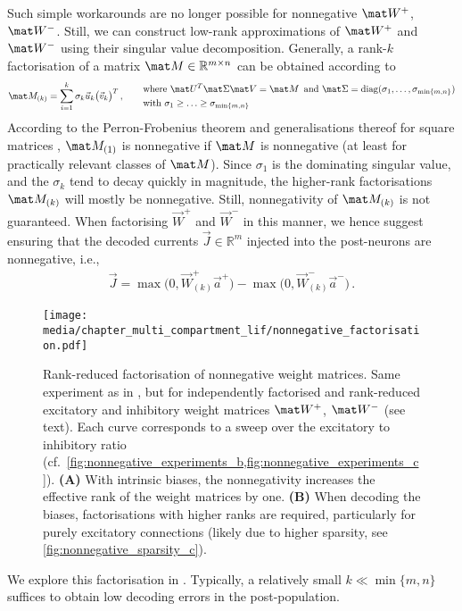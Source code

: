 Such simple workarounds are no longer possible for nonnegative $\mat W^+$, $\mat W^-$.
Still, we can construct low-rank approximations of $\mat W^+$ and $\mat W^-$ using their singular value decomposition.
Generally, a rank-$k$ factorisation of a matrix $\mat M \in \mathbb{R}^{m \times n}$ can be obtained according to
\begin{align}
	\mat M_{(k)} = \sum_{i = 1}^k \sigma_k \vec u_k \bigl(\vec v_k \bigr)^T \,, \quad\quad
	\begin{aligned}	
		&\text{where } \mat U^T \mat \Sigma \mat V = \mat M \,
		\text{ and } \mat \Sigma = \mathrm{diag}(\sigma_1, \ldots, \sigma_{\min\{m, n\}}) \\
		&\text{with }
	\sigma_1 \geq \ldots \geq \sigma_{\min\{m, n\}}
	\end{aligned}
	\label{eqn:svd_factorisation}
\end{align}
According to the Perron-Frobenius theorem and generalisations thereof for square matrices \citep{avin2013generalized}, $\mat M_{(1)}$ is nonnegative if $\mat M$ is nonnegative (at least for practically relevant classes of $\mat M$).
Since $\sigma_1$ is the dominating singular value, and the $\sigma_k$ tend to decay quickly in magnitude, the higher-rank factorisations $\mat M_{(k)}$ will mostly be nonnegative. Still, nonnegativity of $\mat M_{(k)}$ is not guaranteed.
When factorising $\vec W^+$ and $\vec W^-$ in this manner, we hence suggest ensuring that the decoded currents $\vec J \in \mathbb{R}^{m}$ injected into the post-neurons are nonnegative, i.e.,
\begin{align*}
	\vec J = \max\bigl(0, \vec W^+_{(k)} \vec a^+ \bigr) - \max\bigl(0, \vec W^-_{(k)} \vec a^- \bigr) \,.
\end{align*}%
\begin{figure}
	\texttt{[image: media/chapter\_multi\_compartment\_lif/nonnegative\_factorisation.pdf]}
	\caption[Rank-reduced factorisation of nonnegative weight matrices]{Rank-reduced factorisation of nonnegative weight matrices. Same experiment as in , but for independently factorised and rank-reduced excitatory and inhibitory weight matrices $\mat W^+$, $\mat W^-$ (see text). Each curve corresponds to a sweep over the excitatory to inhibitory ratio (cf.~\cref{fig:nonnegative_experiments_b,fig:nonnegative_experiments_c}).
	\textbf{(A)} With intrinsic biases, the nonnegativity increases the effective rank of the weight matrices by one.
	\textbf{(B)} When decoding the biases, factorisations with higher ranks are required, particularly for purely excitatory connections (likely due to higher sparsity, see \cref{fig:nonnegative_sparsity_c}).}
	\label{fig:nonnegative_factorisation}
\end{figure}%
We explore this factorisation in .
Typically, a relatively small $k \ll \min\{m, n\}$ suffices to obtain low decoding errors in the post-population.

